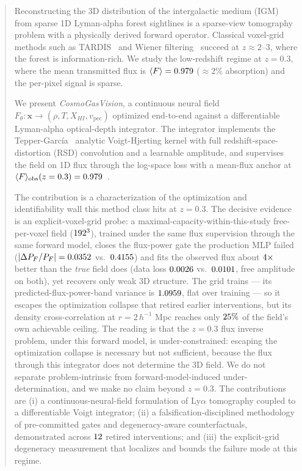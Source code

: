 \begin{abstract}
Reconstructing the 3D distribution of the intergalactic medium (IGM) from sparse 1D Lyman-alpha forest sightlines is a sparse-view tomography problem with a physically derived forward operator. Classical voxel-grid methods such as TARDIS~\cite{horowitz2019tardis} and Wiener filtering~\cite{stark2015tomography} succeed at $z \approx 2$--$3$, where the forest is information-rich. We study the low-redshift regime at $z = 0.3$, where the mean transmitted flux is $\langle F\rangle = \MeanFluxZpThree$ ($\approx 2\%$ absorption) and the per-pixel signal is sparse.

We present \emph{CosmoGasVision}, a continuous neural field $F_\theta:\mathbf{x} \to (\rho, T, X_{HI}, v_{\text{pec}})$ optimized end-to-end against a differentiable Lyman-alpha optical-depth integrator. The integrator implements the Tepper-Garc\'ia~\cite{tepper2006voigt} analytic Voigt-Hjerting kernel with full redshift-space-distortion (RSD) convolution and a learnable amplitude, and supervises the field on 1D flux through the log-space loss with a mean-flux anchor at $\langle F\rangle_{\text{obs}}(z=0.3) = \AnchorMeanF$~\cite{kirkman2007}.

The contribution is a characterization of the optimization and identifiability wall this method class hits at $z = 0.3$. The decisive evidence is an explicit-voxel-grid probe: a maximal-capacity-within-this-study free-per-voxel field ($\GridG^3$), trained under the same flux supervision through the same forward model, closes the flux-power gate the production MLP failed ($|\Delta P_F/P_F| = \PFresidGrid$ vs.\ $\PFresidGridBaseline$) and fits the observed flux about $\KTwoMarginFactor\times$ better than the \emph{true} field does (data loss $\KTwoGridLoss$ vs.\ $\KTwoTruthLoss$, free amplitude on both), yet recovers only weak 3D structure. The grid trains --- its predicted-flux-power-band variance is $\VarPfBandRatio$, flat over training --- so it escapes the optimization collapse that retired earlier interventions, but its density cross-correlation at $r = 2\,h^{-1}$ Mpc reaches only $\XiCeilingFraction$ of the field's own achievable ceiling. The reading is that the $z = 0.3$ flux inverse problem, under this forward model, is under-constrained: escaping the optimization collapse is necessary but not sufficient, because the flux through this integrator does not determine the 3D field. We do not separate problem-intrinsic from forward-model-induced under-determination, and we make no claim beyond $z = 0.3$. The contributions are (i) a continuous-neural-field formulation of Ly$\alpha$ tomography coupled to a differentiable Voigt integrator; (ii) a falsification-disciplined methodology of pre-committed gates and degeneracy-aware counterfactuals, demonstrated across $\NumInterventions$ retired interventions; and (iii) the explicit-grid degeneracy measurement that localizes and bounds the failure mode at this regime.
\end{abstract}

